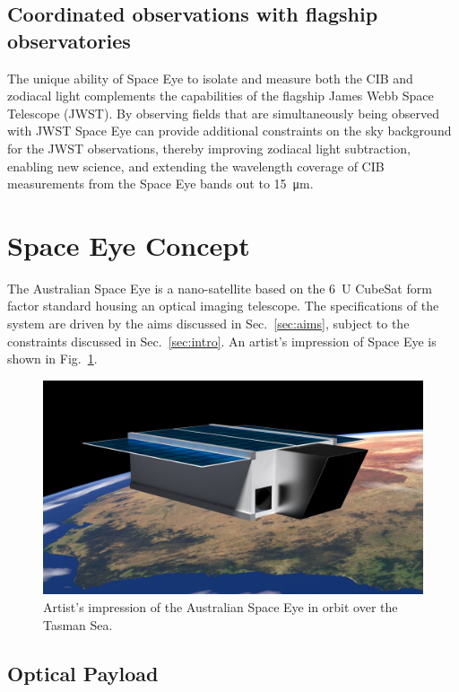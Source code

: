 \documentclass[]{iac}
\begin{document}
\subsection{Coordinated observations with flagship observatories}

The unique ability of Space Eye to isolate and measure both the CIB and zodiacal light complements the capabilities of
the flagship James Webb Space Telescope (JWST). By observing fields that are simultaneously being observed with JWST Space Eye can
provide additional constraints on the sky background for the JWST observations, thereby improving zodiacal light
subtraction, enabling new science, and extending the wavelength coverage of CIB measurements from the Space Eye
bands out to \SI{15}{\micro\metre}.

\section{Space Eye Concept}

The Australian Space Eye is a nano-satellite based on the \SI{6}{U} CubeSat form factor standard\cite{Hevner2011}
housing an optical imaging telescope. The specifications of the system are driven by the aims discussed in
Sec.~\ref{sec:aims}, subject to the constraints discussed in Sec.~\ref{sec:intro}. An artist's impression of Space Eye
is shown in Fig.~\ref{fig:render}.

\begin{figure}[tp]
  \includegraphics[width=\columnwidth]{figures/ASE-2016-a.png}
  \caption{\label{fig:render}Artist's impression of the Australian Space Eye in orbit over the Tasman Sea.}
\end{figure}

\subsection{Optical Payload}
\end{document}
